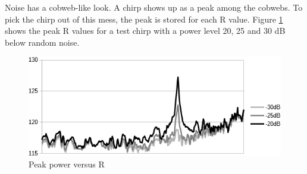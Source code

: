 Noise has a cobweb-like look. A chirp shows up as a peak among the cobwebs.
To pick the chirp out of this mess, the peak is stored for each R value.
Figure \ref{fig:chirpRvalues1} shows the peak R values for a test chirp with a
power level 20, 25 and 30 dB below random noise.
\begin{figure}
  \includegraphics[width=\linewidth]{../source/Rpeaks.png}
  \caption{Peak power versus R}
  \label{fig:chirpRvalues1}
\end{figure}

